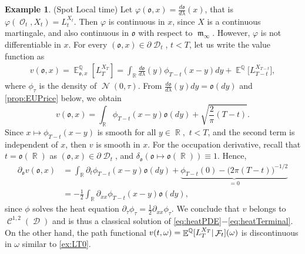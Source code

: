 \documentclass[11pt]{article}
\def\mo{\mathfrak{o}}
\theoremstyle{plain}
\theoremstyle{definition}
\newtheorem{example}{Example}
\DeclareMathOperator{\E}{\mathbb{E}}
\DeclareMathOperator{\Q}{\mathbb{Q}}
\DeclareMathOperator{\R}{\mathbb{R}}
\DeclareMathOperator{\calC}{\mathcal{C}}
\DeclareMathOperator{\calD}{\mathcal{D}}
\DeclareMathOperator{\calF}{\mathcal{F}}
\DeclareMathOperator{\calN}{\mathcal{N}}
\DeclareMathOperator{\calO}{\mathcal{O}}
\DeclareMathOperator{\frakm}{\mathfrak{m}}
\begin{document}
\begin{example} \label{ex:heatspotLT} \textnormal{(Spot Local time) } Let $\varphi(\mo,x) = \frac{d\mo}{d\lambda}(x)$, that is $\varphi(\calO_t,X_t) = L_t^{X_t}$. Then $\varphi$ is continuous in $x$, since $X$ is a continuous martingale, and also continuous in  $\mo$  with respect to $\frakm_{\infty}$. 
However, $\varphi$ is  not differentiable in $x$.  
For every $(\mo,x) \in \partial\calD_t$, $t<T$, let us  write the value function as  
  \begin{align*}
            v(\mo,x) = \E^{\Q}_{\mo,x}[L_T^{X_T}] 
              = \int_{\R} \frac{d\mo}{d\lambda}(y) \phi_{T-t}(x-y) dy +  \E^{\Q}\big[L_{T-t}^{X_{T-t}}\big],
        \end{align*}
        where $\phi_{\tau}$ is the density 
        of $\calN(0,\tau).$ 
        From $\frac{d\mo}{d\lambda}(y)dy = \mo(dy)$ and \cref{prop:EUPrice} below,  we obtain 
    \begin{equation}\label{eq:condexpLT}
              v(\mo,x)= \int_{\R} \phi_{T-t}(x-y) \mo(dy) + \sqrt{\frac{2}{\pi}(T-t)}. %
          \end{equation}
          Since $x\mapsto \phi_{T-t}(x-y)$ is smooth for all $y\in \R,$ $t<T$, and the second term is  independent of $x$, then $v$ is smooth in $x$. For the occupation derivative, recall that $t = \mo(\R)$ as $(\mo,x) \in \partial\calD_t$,  and $\delta_{\mo}(\mo\mapsto \mo(\R)) \equiv 1$. Hence,  
          \begin{align*}
            \partial_{\mo}v(\mo,x)  &= \int_{\R} \partial_t\phi_{T-t}(x-y) \mo(dy) + \underbrace{\phi_{T-t}(0)  -\big(2\pi (T-t)\big)^{-1/2}}_{=0}\\
            &= -\frac{1}{2}\int_{\R} \partial_{xx}\phi_{T-t}(x-y) \mo(dy),
          \end{align*}
          since  $\phi$ solves the heat equation $\partial_{\tau} \phi_{\tau} = \frac{1}{2}\partial_{xx}\phi_{\tau}$. 
          We conclude that $v$ belongs to $\calC^{1,2}(\calD)$  and  is thus a classical solution of \eqref{eq:heatPDE}$-$\eqref{eq:heatTerminal}. 
         On the other hand, the  path functional $\textnormal{v}(t,\omega) = \E^{\Q}[L_T^{X_T}  |   \calF_t](\omega)$ 
         is  discontinuous in  $\omega$  similar to \cref{ex:LT0}. 
\end{example}
\end{document}
